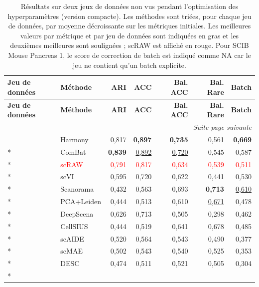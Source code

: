 \begingroup
\footnotesize
\setlength{\tabcolsep}{6pt}
\renewcommand{\arraystretch}{1.1}
\begin{longtable}{@{}ll rrrrr@{}}
\caption[Résultats sur deux jeux de données non vus pendant l'optimisation des hyperparamètres.]{Résultats sur deux jeux de données non vus pendant l'optimisation des hyperparamètres (version compacte). Les méthodes sont triées, pour chaque jeu de données, par moyenne décroissante sur les métriques initiales. Les meilleures valeurs par métrique et par jeu de données sont indiquées en gras et les deuxièmes meilleures sont soulignées ; scRAW est affiché en rouge. Pour SCIB Mouse Pancreas 1, le score de correction de batch est indiqué comme NA car le jeu ne contient qu'un batch explicite.}
\label{tab:scraw_holdout_pancreas_results}\\
\toprule
\textbf{Jeu de données} & \textbf{Méthode} & \textbf{ARI} & \textbf{ACC} & \textbf{Bal. ACC} & \textbf{Bal. Rare} & \textbf{Batch} \\
\midrule
\endfirsthead
\toprule
\textbf{Jeu de données} & \textbf{Méthode} & \textbf{ARI} & \textbf{ACC} & \textbf{Bal. ACC} & \textbf{Bal. Rare} & \textbf{Batch} \\
\midrule
\endhead
\midrule
\multicolumn{7}{r}{\textit{Suite page suivante}}\\
\endfoot
\bottomrule
\endlastfoot
\multirow{14}{*}{Human Pancreas}
  & Harmony & \underline{0,817} & \textbf{0,897} & \textbf{0,735} & 0,561 & \textbf{0,669} \\*
  & ComBat & \textbf{0,839} & \underline{0,892} & \underline{0,720} & 0,545 & 0,587 \\*
  & \textcolor{red}{scRAW} & \textcolor{red}{0,791} & \textcolor{red}{0,817} & \textcolor{red}{0,634} & \textcolor{red}{0,539} & \textcolor{red}{0,511} \\*
  & scVI & 0,595 & 0,720 & 0,622 & 0,441 & 0,530 \\*
  & Scanorama & 0,432 & 0,563 & 0,693 & \textbf{0,713} & \underline{0,610} \\*
  & PCA+Leiden & 0,444 & 0,513 & 0,610 & \underline{0,671} & 0,478 \\*
  & DeepScena & 0,626 & 0,713 & 0,505 & 0,298 & 0,462 \\*
  & CellSIUS & 0,444 & 0,519 & 0,641 & 0,678 & 0,485 \\*
  & scAIDE & 0,520 & 0,564 & 0,543 & 0,490 & 0,377 \\*
  & scMAE & 0,502 & 0,543 & 0,540 & 0,525 & 0,353 \\*
  & DESC & 0,474 & 0,511 & 0,521 & 0,505 & 0,304 \\*

\end{longtable}
